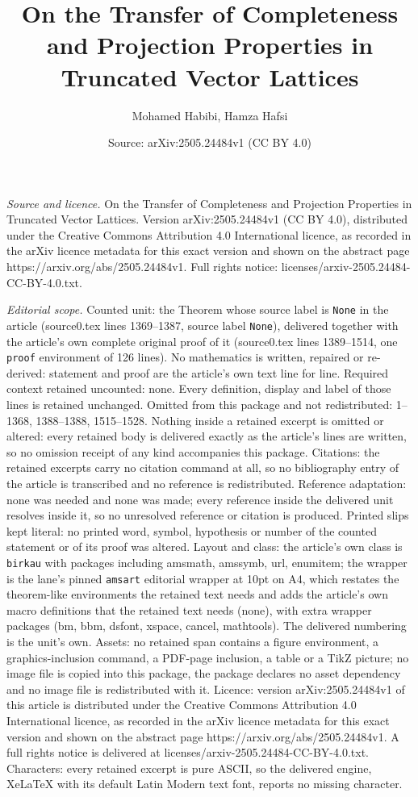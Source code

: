 \documentclass[10pt,a4paper]{amsart}
\title[On the Transfer of Completeness and Projection Properties in]{On the Transfer of Completeness and Projection Properties in Truncated Vector Lattices}
\author{Mohamed Habibi, Hamza Hafsi}
\date{Source: arXiv:2505.24484v1 (CC BY 4.0)}
\begin{document}
\maketitle

\noindent\emph{Source and licence.} On the Transfer of Completeness and Projection Properties in Truncated Vector Lattices. Version arXiv:2505.24484v1 (CC BY 4.0), distributed under the Creative Commons Attribution 4.0 International licence, as recorded in the arXiv licence metadata for this exact version and shown on the abstract page https://arxiv.org/abs/2505.24484v1. Full rights notice: licenses/arxiv-2505.24484-CC-BY-4.0.txt.\par\smallskip

\noindent\textit{Editorial scope.} Counted unit: the Theorem whose source label is \texttt{None} in the article (source0.tex lines 1369--1387, source label \texttt{None}), delivered together with the article's own complete original proof of it (source0.tex lines 1389--1514, one \texttt{proof} environment of 126 lines). No mathematics is written, repaired or re-derived: statement and proof are the article's own text line for line. Required context retained uncounted: none. Every definition, display and label of those lines is retained unchanged. Omitted from this package and not redistributed: 1--1368, 1388--1388, 1515--1528. Nothing inside a retained excerpt is omitted or altered: every retained body is delivered exactly as the article's lines are written, so no omission receipt of any kind accompanies this package. Citations: the retained excerpts carry no citation command at all, so no bibliography entry of the article is transcribed and no reference is redistributed. Reference adaptation: none was needed and none was made; every reference inside the delivered unit resolves inside it, so no unresolved reference or citation is produced. Printed slips kept literal: no printed word, symbol, hypothesis or number of the counted statement or of its proof was altered. Layout and class: the article's own class is \texttt{birkau} with packages including amsmath, amssymb, url, enumitem; the wrapper is the lane's pinned \texttt{amsart} editorial wrapper at 10pt on A4, which restates the theorem-like environments the retained text needs and adds the article's own macro definitions that the retained text needs (none), with extra wrapper packages (bm, bbm, dsfont, xspace, cancel, mathtools). The delivered numbering is the unit's own. Assets: no retained span contains a figure environment, a graphics-inclusion command, a PDF-page inclusion, a table or a TikZ picture; no image file is copied into this package, the package declares no asset dependency and no image file is redistributed with it. Licence: version arXiv:2505.24484v1 of this article is distributed under the Creative Commons Attribution 4.0 International licence, as recorded in the arXiv licence metadata for this exact version and shown on the abstract page https://arxiv.org/abs/2505.24484v1. A full rights notice is delivered at licenses/arxiv-2505.24484-CC-BY-4.0.txt. Characters: every retained excerpt is pure ASCII, so the delivered engine, XeLaTeX with its default Latin Modern text font, reports no missing character.
\end{document}
